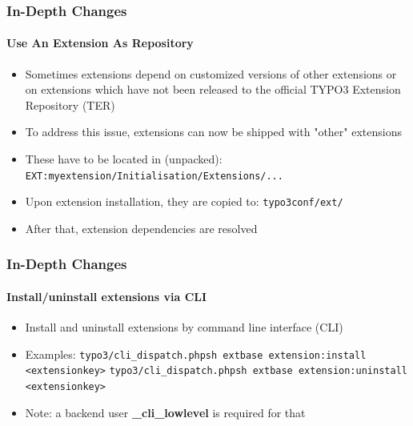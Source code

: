 
\begin{frame}[fragile]
	\frametitle{In-Depth Changes}
	\framesubtitle{Use An Extension As Repository}

	\begin{itemize}
		\item Sometimes extensions depend on customized versions of other extensions or on extensions which have not been released to the official TYPO3 Extension Repository (TER)
		\item To address this issue, extensions can now be shipped with "other" extensions
		\item These have to be located in (unpacked):\newline
			\texttt{EXT:myextension/Initialisation/Extensions/...}

		\item Upon extension installation, they are copied to:\newline
			\texttt{typo3conf/ext/}

		\item After that, extension dependencies are resolved

	\end{itemize}

\end{frame}


\begin{frame}[fragile]
	\frametitle{In-Depth Changes}
	\framesubtitle{Install/uninstall extensions via CLI}

	\begin{itemize}
		\item Install and uninstall extensions by command line interface (CLI)
		\item Examples:
			\lstinline!typo3/cli_dispatch.phpsh extbase extension:install <extensionkey>!
			\lstinline!typo3/cli_dispatch.phpsh extbase extension:uninstall <extensionkey>!

		\item Note: a backend user \textbf{\_cli\_lowlevel} is required for that
	\end{itemize}

\end{frame}


